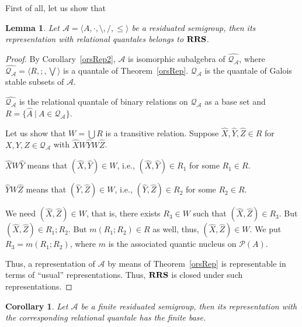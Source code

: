 \documentclass[a4paper]{article}
\theoremstyle{defin}
\theoremstyle{theorem}
\theoremstyle{prop}
\theoremstyle{lemma}
\newtheorem{lemma}{Lemma}
\theoremstyle{ex}
\theoremstyle{col}
\newtheorem{col}{Corollary}
\theoremstyle{claim}
\begin{document}
First of all, let us show that
\begin{lemma} \label{rrsLemma}
  Let $\mathcal{A} = \langle A, \cdot, \setminus, /, \leq \rangle$ be a residuated semigroup, then its representation with relational quantales belongs to ${\bf RRS}$.
\end{lemma}

\begin{proof}
  By Corollary~\ref{orsRep2}, $\mathcal{A}$ is isomorphic subalgebra of $\widehat{\mathcal{Q}_{\mathcal{A}}}$, where
  $\widehat{\mathcal{Q}_{\mathcal{A}}} = \langle R, ;, \bigvee \rangle$ is a quantale of Theorem~\ref{orsRep}.
  $\mathcal{Q}_{\mathcal{A}}$ is the quantale of Galois stable subsets of $\mathcal{A}$.

  $\widehat{\mathcal{Q}_{\mathcal{A}}}$ is the relational quantale of binary relations on $\mathcal{Q}_{\mathcal{A}}$ as a base set and
  $R = \{ \hat{A} \: | \: A \in \mathcal{Q}_{\mathcal{A}}\}$.

  Let us show that $W = \bigcup R$ is a transitive relation.
  Suppose $\widehat{X}, \widehat{Y}, \widehat{Z} \in R$ for $X, Y, Z \in \mathcal{Q}_{\mathcal{A}}$ with
  $\widehat{X} W \widehat{Y} W \widehat{Z}$.

  $\widehat{X} W \widehat{Y}$ means that $(\widehat{X}, \widehat{Y}) \in W$, i.e., $(\widehat{X}, \widehat{Y}) \in R_1$ for some
  $R_1 \in R$.

  $\widehat{Y} W \widehat{Z}$ means that $(\widehat{Y}, \widehat{Z}) \in W$, i.e., $(\widehat{Y}, \widehat{Z}) \in R_2$ for some
  $R_2 \in R$.

  We need $(\widehat{X}, \widehat{Z}) \in W$, that is, there exists $R_3 \in W$ such that $(\widehat{X}, \widehat{Z}) \in R_3$.
  But $(\widehat{X}, \widehat{Z}) \in R_1 ; R_2$. But $m(R_1 ; R_2) \in R$ as well, thus, $(\widehat{X}, \widehat{Z}) \in W$.
  We put $R_3 = m(R_1 ; R_2)$, where $m$ is the associated quantic nucleus on $\mathcal{P}(A)$.

  Thus, a representation of $\mathcal{A}$ by means of Theorem~\ref{orsRep} is representable in terms of ``usual'' representations.
  Thus, ${\bf RRS}$ is closed under such representations.
\end{proof}

\begin{col}\label{finite}
  Let $\mathcal{A}$ be a finite residuated semigroup, then its representation with the corresponding relational quantale has the finite base.
\end{col}
\end{document}
